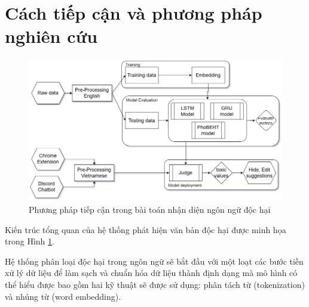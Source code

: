 \section{Cách tiếp cận và phương pháp nghiên cứu}


\begin{figure}[htb]
    \centering
    \includegraphics[width=\textwidth]{image/ToxicDetection_workflow.drawio.png}
    \caption{Phương pháp tiếp cận trong bài toán nhận diện ngôn ngữ độc hại}
    \label{figure:ToxicDetection_workflow}
\end{figure}

Kiến trúc tổng quan của hệ thống phát hiện văn bản độc hại được minh họa trong Hình \ref{figure:ToxicDetection_workflow}.

Hệ thống phân loại độc hại trong ngôn ngữ sẽ bắt đầu với một loạt các bước tiền xử lý dữ liệu để làm sạch và chuẩn hóa dữ liệu thành định dạng mà mô hình có thể hiểu được bao gồm hai kỹ thuật sẽ được sử dụng: phân tách từ (tokenization) và nhúng từ (word embedding).

